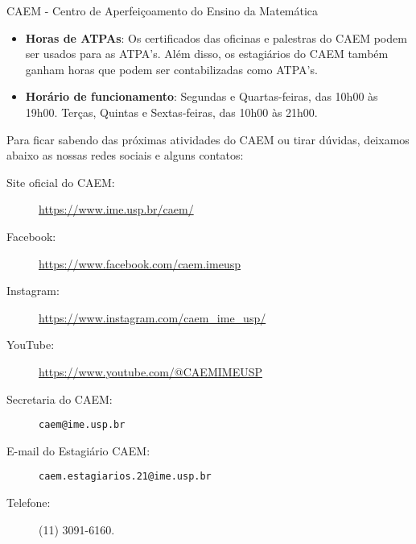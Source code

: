 \begin{secao}{CAEM - Centro de Aperfeiçoamento do Ensino da Matemática}
\begin{itemize}
\item \textbf{Horas de ATPAs}: Os certificados das oficinas e palestras
do CAEM podem ser usados para as ATPA's. Além disso, os estagiários do
CAEM também ganham horas que podem ser contabilizadas como ATPA's.

\item \textbf{Horário de funcionamento}: Segundas e Quartas-feiras,
  das 10h00 às 19h00. Terças, Quintas e Sextas-feiras, das 10h00 às
  21h00.
  
\end{itemize}

\pagebreak %

Para ficar sabendo das próximas atividades do CAEM ou tirar dúvidas,
deixamos abaixo as nossas redes sociais e alguns contatos:

\begin{description}

    \item[Site oficial do CAEM:] \url{https://www.ime.usp.br/caem/}

    \item[Facebook:] \url{https://www.facebook.com/caem.imeusp}

    \item[Instagram:] \url{https://www.instagram.com/caem_ime_usp/}

    \item[YouTube:] \url{https://www.youtube.com/@CAEMIMEUSP}

    \item[Secretaria do CAEM:] \texttt{caem@ime.usp.br}

    \item[E-mail do Estagiário CAEM:] \texttt{caem.estagiarios.21@ime.usp.br}

    \item[Telefone:] (11) 3091-6160.

\end{description}

\end{secao}
